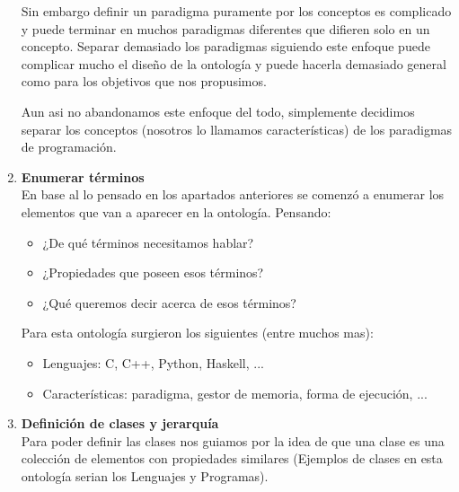 \documentclass[12pt, titlepage, a4paper]{article}
\begin{document}
\begin{enumerate}
{           Sin embargo definir un paradigma puramente por los conceptos es complicado y puede terminar en muchos
           paradigmas diferentes que difieren solo en un concepto. Separar demasiado los paradigmas siguiendo este enfoque 
           puede complicar mucho el diseño de la ontología y puede hacerla demasiado general como para los objetivos que nos propusimos.

           Aun asi no abandonamos este enfoque del todo, simplemente decidimos separar los conceptos (nosotros lo llamamos
           características) de los paradigmas de programación.
           }
    \item {\textbf{Enumerar términos}\\
           En base al lo pensado en los apartados anteriores se comenzó a 
           enumerar los elementos que van a aparecer en la ontología.
           Pensando:
           \begin{itemize}
            \item {¿De qué términos necesitamos hablar?}
            \item {¿Propiedades que poseen esos términos?}
            \item {¿Qué queremos decir acerca de esos términos?} 
           \end{itemize}
           Para esta ontología surgieron los siguientes (entre muchos mas):
           \begin{itemize}
            \item {Lenguajes: C, C++, Python, Haskell, ...}
            \item {Características: paradigma, gestor de memoria, forma de ejecución, ...}
           \end{itemize}}
    \item {\textbf{Definición de clases y jerarquía}\\
           Para poder definir las clases nos guiamos por la idea de que 
           una clase es una colección de elementos con propiedades
           similares (Ejemplos de clases en esta ontología serian los 
           Lenguajes y Programas).\\

}
\end{enumerate}
\end{document}
